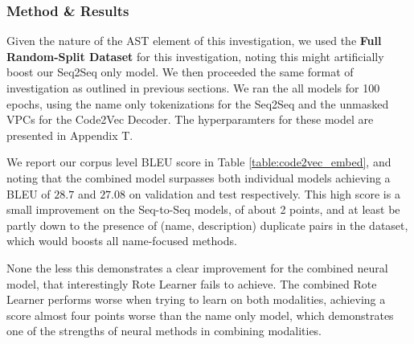 \subsubsection{Method \& Results} %

Given the nature of the AST element of this investigation, we used the \textbf{Full Random-Split Dataset} for this investigation, noting this might artificially boost our Seq2Seq only model. We then proceeded the same format of investigation as outlined in previous sections. 
We ran the all models for 100 epochs, using the name only tokenizations for the Seq2Seq and the unmasked VPCs for the Code2Vec Decoder. The hyperparamters for these model are presented in Appendix T. 

We report our corpus level BLEU score in Table \ref{table:code2vec_embed}, and noting that the combined model surpasses both individual models achieving a BLEU of $28.7$ and $27.08$ on validation and test respectively. 
This high score is a small improvement on the Seq-to-Seq models, of about 2 points, and at least be partly down to the presence of (name, description) duplicate pairs in the dataset, which would boosts all name-focused methods.

None the less this demonstrates a clear improvement for the combined neural model, that interestingly Rote Learner fails to achieve. The combined Rote Learner performs worse when trying to learn on both modalities, achieving a score almost four points worse than the name only model, which demonstrates one of the strengths of neural methods in combining modalities.


